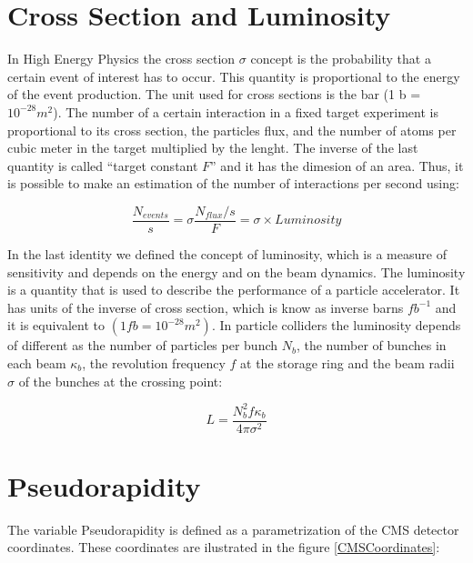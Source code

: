  \section{Cross Section and Luminosity}
 
 In High Energy Physics the cross section $\sigma$ concept is the probability that a certain event of interest has to occur. This quantity is proportional to the energy of the event production. The unit 
 used for cross sections is the bar (1 b = $10^{-28} m^2$). The number of a certain interaction in a fixed target experiment is proportional to its cross section, the particles flux, and the
 number of atoms per cubic meter in the target multiplied by the lenght. The inverse of the last quantity is called ``target constant $F$'' and it has the dimesion of an area. Thus, it is possible
 to make an estimation of the number of interactions per second using:
 
 \begin{equation}
  \frac{N_{events}}{s} = \sigma \frac{N_{flux}/s}{F} = \sigma \times Luminosity
 \end{equation}

 In the last identity we defined the concept of luminosity, which is a measure of sensitivity and depends on the energy and on the beam dynamics.  The luminosity is a quantity that is used to 
 describe the performance of a particle accelerator. It has units of the inverse of cross section, which is know as inverse barns $fb^{-1}$ and it is equivalent to $(1 fb = 10^{-28} m^2)$. 
 In particle colliders the 
 luminosity depends of different as the number of particles per bunch $N_b$, the number of bunches in each beam $\kappa_b$, the revolution frequency $f$ at the storage ring and the beam radii 
 $ \sigma$ of the bunches at the crossing point:
 
 \begin{equation}
  L = \frac{N_b^2 f \kappa_b}{4\pi \sigma^2} 
 \end{equation}

 \section{Pseudorapidity}
 
 The variable Pseudorapidity is defined as a parametrization of the CMS detector coordinates. These coordinates are ilustrated in the figure \ref{CMSCoordinates}:
 
 
